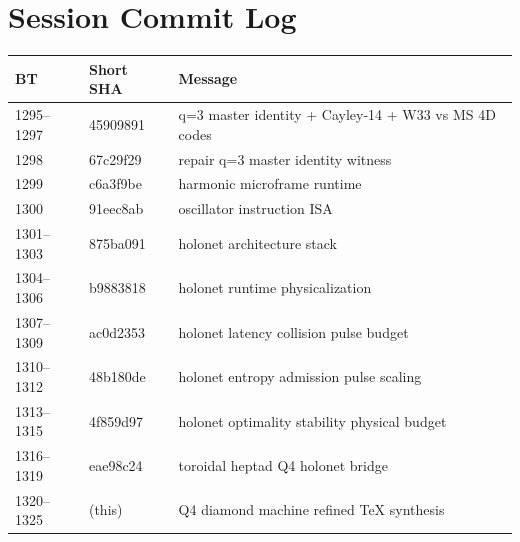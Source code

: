 \documentclass[12pt,a4paper]{article}
\begin{document}
\section{Session Commit Log}

\begin{center}
\begin{tabular}{lll}
\toprule
BT & Short SHA & Message\\
\midrule
1295--1297 & 45909891 & q=3 master identity + Cayley-14 + W33 vs MS 4D codes\\
1298 & 67c29f29 & repair q=3 master identity witness\\
1299 & c6a3f9be & harmonic microframe runtime\\
1300 & 91eec8ab & oscillator instruction ISA\\
1301--1303 & 875ba091 & holonet architecture stack\\
1304--1306 & b9883818 & holonet runtime physicalization\\
1307--1309 & ac0d2353 & holonet latency collision pulse budget\\
1310--1312 & 48b180de & holonet entropy admission pulse scaling\\
1313--1315 & 4f859d97 & holonet optimality stability physical budget\\
1316--1319 & eae98c24 & toroidal heptad Q4 holonet bridge\\
1320--1325 & (this) & Q4 diamond machine refined TeX synthesis\\
\bottomrule
\end{tabular}
\end{center}
\end{document}
